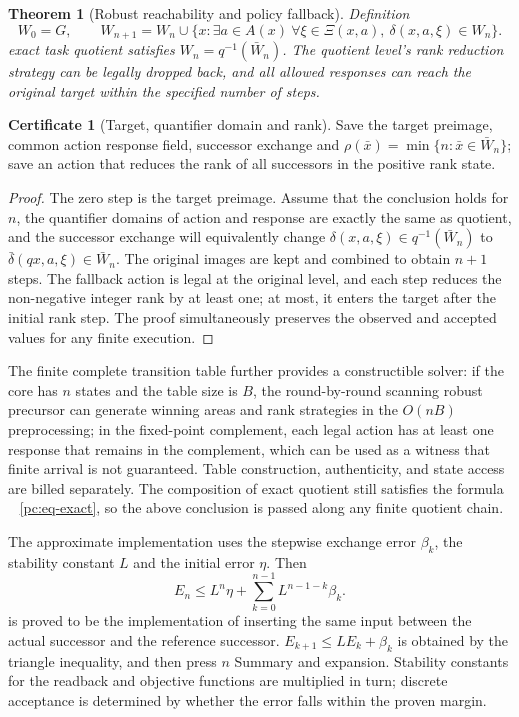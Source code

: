 \documentclass[11pt,a4paper]{article}
\theoremstyle{plain}
\newtheorem{theorem}{Theorem}[section]
\theoremstyle{definition}
\newtheorem*{certificate}{Certificate}
\theoremstyle{remark}
\begin{document}
\begin{CJK*}
\begin{theorem}
[Robust reachability and policy fallback]\label{pc:reach}
Definition \[
 W_0=G,\qquad
 W_{n+1}=W_n\cup\{x:\exists a\in A(x)\ \forall\xi\in\Xi(x,a),\
                         \delta(x,a,\xi)\in W_n\}.
\] exact task quotient satisfies $W_n=q^{-1}(\bar W_n)$. The quotient level's rank reduction strategy can be legally dropped back, and all allowed responses can reach the original target within the specified number of steps.\end{theorem}
\begin{certificate}
[Target, quantifier domain and rank]Save the target preimage, common action response field, successor exchange and $\rho(\bar x)=\min\{n:\bar x\in\bar W_n\}$; save an action that reduces the rank of all successors in the positive rank state.\end{certificate}
\begin{proof}
The zero step is the target preimage. Assume that the conclusion holds for $n$, the quantifier domains of action and response are exactly the same as quotient, and the successor exchange will equivalently change $\delta(x,a,\xi)\in q^{-1}(\bar W_n)$ to $\bar\delta(qx,a,\xi)\in\bar W_n$. The original images are kept and combined to obtain $n+1$ steps. The fallback action is legal at the original level, and each step reduces the non-negative integer rank by at least one; at most, it enters the target after the initial rank step. The proof simultaneously preserves the observed and accepted values for any finite execution.\end{proof}


The finite complete transition table further provides a constructible solver: if the core has $n$ states and the table size is $B$, the round-by-round scanning robust precursor can generate winning areas and rank strategies in the $O(nB)$ preprocessing; in the fixed-point complement, each legal action has at least one response that remains in the complement, which can be used as a witness that finite arrival is not guaranteed. Table construction, authenticity, and state access are billed separately. The composition of exact quotient still satisfies the formula ~ \eqref{pc:eq-exact}, so the above conclusion is passed along any finite quotient chain.

The approximate implementation uses the stepwise exchange error $\beta_k$, the stability constant $L$ and the initial error $\eta$. Then \begin{equation}
\label{pc:eq-error}
 E_n\le L^n\eta+\sum_{k=0}^{n-1}L^{n-1-k}\beta_k.
\end{equation} is proved to be the implementation of inserting the same input between the actual successor and the reference successor. $E_{k+1}\le LE_k+\beta_k$ is obtained by the triangle inequality, and then press $n$ Summary and expansion. Stability constants for the readback and objective functions are multiplied in turn; discrete acceptance is determined by whether the error falls within the proven margin.


\end{CJK*}
\end{document}
